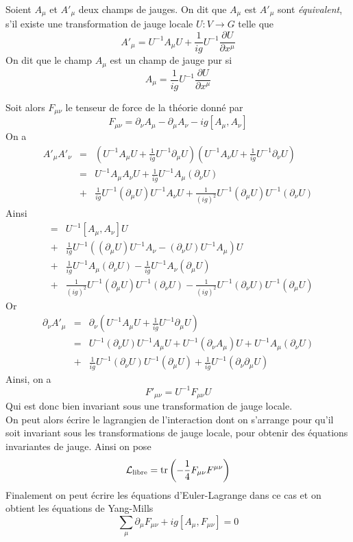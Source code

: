 \documentclass[12pt, a4paper]{book}
\begin{document}
\begin{defi}
Soient $A_\mu$ et $A'_\mu$ deux champs de jauges. On dit que $A_\mu$ est $A'_\mu$ sont \emph{équivalent}, s'il existe une transformation de jauge locale $U: V\to G$ telle que 
$$A'_\mu = U^{-1}A_\mu U + \frac{1}{ig}U^{-1}\frac{\partial U}{\partial x^\mu}$$
On dit que le champ $A_\mu$ est un champ de jauge pur si 
$$A_\mu = \frac{1}{ig}U^{-1}\frac{\partial U}{\partial x^\mu}$$
\end{defi}
Soit alors $F_{\mu\nu}$ le tenseur de force de la théorie donné par
$$F_{\mu\nu} = \partial_\nu A_\mu - \partial_\mu A_\nu - ig[A_\mu, A_\nu]$$
On a 
\begin{eqnarray*}
A'_\mu A'_\nu &=& \left(U^{-1}A_\mu U + \frac{1}{ig}U^{-1}\partial_\mu U\right)\left(U^{-1}A_\nu U + \frac{1}{ig}U^{-1}\partial_\nu U\right) \\
&=& U^{-1}A_\mu A_\nu U + \frac{1}{ig}U^{-1}A_\mu (\partial_\nu U) \\
&+& \frac{1}{ig}U^{-1} (\partial_\mu U) U^{-1}A_\nu U + \frac{1}{(ig)^2}U^{-1}(\partial_\mu U) U^{-1} (\partial_\nu U)
\end{eqnarray*}
Ainsi
\begin{eqnarray*}
[A'_\mu, A'_\nu] &=& U^{-1}[A_\mu, A_\nu]U \\
&+& \frac{1}{ig}U^{-1}\left( (\partial_\mu U)U^{-1}A_\nu - (\partial_\nu U)U^{-1}A_\mu \right) U \\ 
&+& \frac{1}{ig}U^{-1} A_\mu (\partial_\nu U) - \frac{1}{ig}U^{-1} A_\nu (\partial_\mu U) \\
&+& \frac{1}{(ig)^2}U^{-1}(\partial_\mu U) U^{-1} (\partial_\nu U) - \frac{1}{(ig)^2}U^{-1}(\partial_\nu U) U^{-1} (\partial_\mu U)
\end{eqnarray*}
Or 
\begin{eqnarray*}
\partial_\nu A'_\mu &=& \partial_\nu \left(U^{-1}A_\mu U + \frac{1}{ig}U^{-1}\partial_\mu U\right) \\
&=& U^{-1} (\partial_\nu U) U^{-1} A_\mu U + U^{-1} (\partial_\nu A_\mu)U + U^{-1}A_\mu (\partial_\nu U) \\
&+& \frac{1}{ig}U^{-1}(\partial_\nu U)U^{-1}(\partial_\mu U) + \frac{1}{ig} U^{-1} (\partial_\nu \partial_\mu U)
\end{eqnarray*}
Ainsi, on a
$$F'_{\mu\nu} = U^{-1} F_{\mu\nu} U$$
Qui est donc bien invariant sous une transformation de jauge locale. \\

On peut alors écrire le lagrangien de l'interaction dont on s'arrange pour qu'il soit invariant sous les transformations de jauge locale, pour obtenir des équations invariantes de jauge. Ainsi on pose
$$\mathcal{L}_{\text{libre}} = \operatorname{tr} \left(-\frac{1}{4}F_{\mu\nu}F^{\mu\nu}\right)$$
Finalement on peut écrire les équations d'Euler-Lagrange dans ce cas et on obtient les équations de Yang-Mills
$$\sum_\mu \partial_\mu F_{\mu\nu} + ig[A_\mu, F_{\mu\nu}] = 0$$
\end{document}
